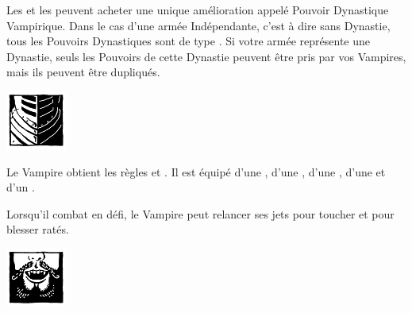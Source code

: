 \closearmynewsection

\newpage
{}

\spaceaftersection{}

Les \vampirelords{} et les \vampireheroes{} peuvent  acheter une unique amélioration appelé Pouvoir Dynastique Vampirique. Dans le cas d'une armée Indépendante, c'est à dire sans Dynastie, tous les Pouvoirs Dynastiques sont de type \oneofakind{}. Si votre armée représente une Dynastie, seuls les Pouvoirs de cette Dynastie peuvent être pris par vos Vampires, mais ils peuvent être dupliqués.

\begin{multicols}{2}\raggedcolumns

\begin{center}\includegraphics[width=2cm]{logos/logo_brotherhood.png}\end{center}
\vspace*{-1.2cm}

\startpricelist

 Le Vampire obtient les règles \weaponmaster{} et . Il est équipé d'une \pw{}, d'une \halberd{}, d'une \gw{}, d'une \lance{} et d'un \shield{}.

 Lorsqu'il combat en défi, le Vampire peut relancer ses jets pour toucher et pour blesser ratés.

\endpricelist

\begin{center}\includegraphics[width=2cm]{logos/logo_vonkarnstein.png}\end{center}
\vspace*{-1.2cm}


\end{multicols}
